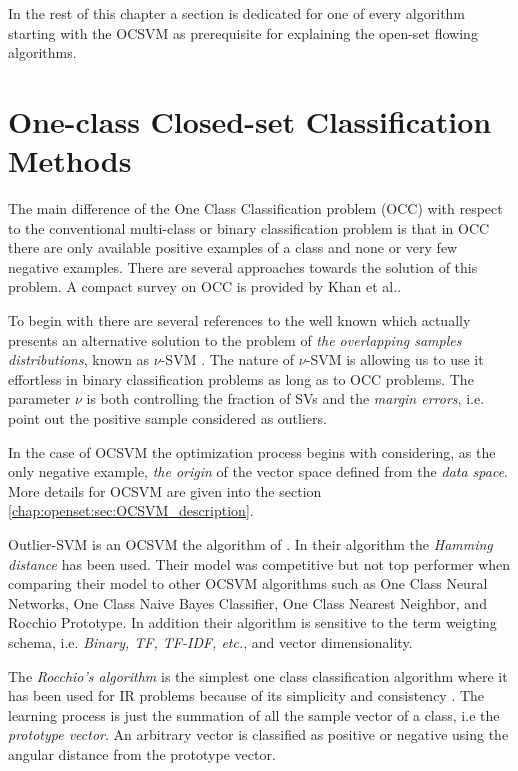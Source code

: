 In the rest of this chapter a section is dedicated for one of every algorithm starting with the OCSVM as prerequisite for explaining the open-set flowing algorithms.


\section{One-class Closed-set Classification Methods}\label{chap:openset:sec:One_Class_Classification}

The main difference of the One Class Classification problem (OCC) with respect to the conventional multi-class or binary classification problem is that in OCC there are only available positive examples of a class and none or very few negative examples. There are several approaches towards the solution of this problem. A compact survey on OCC is provided by Khan et al.\parencite{khan2010survey}. 

To begin with there are several references to the well known \parencite{scholkopf1999estimating} which actually presents an alternative solution to the problem of \textit{the overlapping samples distributions}, known as $\nu$-SVM \parencite{bishop2006}. The nature of $\nu$-SVM is allowing us to use it effortless in binary classification problems as long as to OCC problems. The parameter $\nu$ is both controlling the fraction of SVs and the \textit{margin errors}, i.e. point out the positive sample considered as outliers. 

In the case of OCSVM the optimization process begins with considering, as the only negative example, \textit{the origin} of the vector space defined from the \textit{data space}. More details for OCSVM are given into the section \ref{chap:openset:sec:OCSVM_description}.

Outlier-SVM is an OCSVM the algorithm of \parencite{manevitz2002one,khan2010survey}. In their algorithm the \textit{Hamming distance} has been used. Their model was competitive but not top performer when comparing their model to other OCSVM algorithms such as One Class Neural Networks, One Class Naive Bayes Classifier, One Class Nearest Neighbor, and Rocchio Prototype. In addition their algorithm is sensitive to the term weigting schema, i.e. \textit{Binary, TF, TF-IDF, etc.}, and vector dimensionality. 

The \textit{Rocchio's algorithm} is the simplest one class classification algorithm where it has been used for IR problems because of its simplicity and consistency \parencite{joachims1997probabilistic}. The learning process is just the summation of all the sample vector of a class, i.e the \textit{prototype vector}. An arbitrary vector is classified as positive or negative using the angular distance from the prototype vector.

